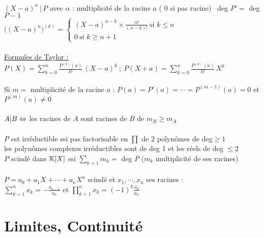 \documentclass[12 pt]{book}
\begin{document}
\begin{flushleft}
\begin{doublespace}
	\text{ }\\
	$(X - a)^\alpha \, | \, P$ avec $\alpha$ : multiplicité de la racine $a$ ( 0 si pas racine) \ deg $P' = $ deg $P - 1$\\
	$\Big( (X - a)^n \Big)^{(k)} = \left\{\begin{array}{ll} (X - a)^{n - k} \times \frac{ n!}{(n - k)!} \ \text{si } k\leq n \\  0 \ \text{si } k\geq n+1 \end{array} \right.$\\
	
	\text{ }\\
	\underline{Formules de Taylor :}\\
	$P(X) = \sum_{k = 0}^n \frac{P^{(k)}(a)}{k!} \, (X - a)^k \ ; \ P(X + a ) = \sum_{ k = 0}^n \frac{P^{(k)}(a)}{k!} \, X^k$\\
	\text{ }\\
	Si $m =$ multiplicité de la racine $a$ : $P(a) =P'(a) = \cdots = P^{(m - 1)} (a) = 0$ et $P^{(m)} (a) \ne 0$\\
	\text{ }\\
	$A | B \Leftrightarrow$ les racines de $A$ sont racines de $B$ de $m_B \geq m_A$\\
	
	\text{ }\\
	$P$ est irréductible ssi pas factorisable en $\prod$ de 2 polynômes de deg$\geq 1$\\
	les polynômes complexes irréductibles sont de deg 1 et les réels de deg $\leq 2$\\
	$P$ scindé dans $\mathbb{K}[X]$ ssi $\sum_{ k =1} m_k = $ deg $P$ ($m_k$ multiplicité de ses racines)\\
	\text{ }\\
	$P = a_0 + a_1X + \cdots + a_n X^n$ scindé et $x_1, \cdots, x_n$ ses racines :\\
	$\sum_{k = 1}^n x_k = -\frac{a_{n -1}}{a_n}$ et $\prod_{ k =1}^n x_k = (- 1)^k \frac{a_0}{a_n}$\\
		
\end{doublespace}
\end{flushleft}

\section*{Limites, Continuité}
\end{document}
